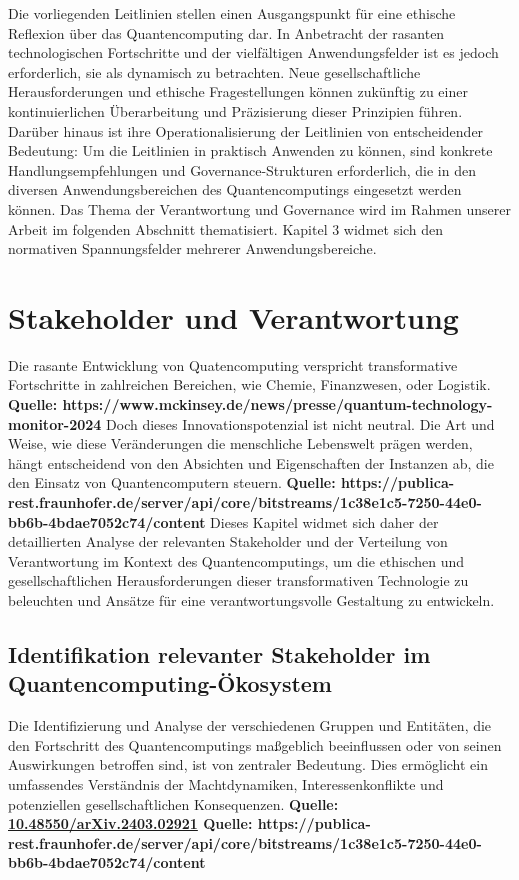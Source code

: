 Die vorliegenden Leitlinien stellen einen Ausgangspunkt für eine ethische Reflexion über das Quantencomputing dar. In Anbetracht der rasanten technologischen Fortschritte und der vielfältigen Anwendungsfelder ist es jedoch erforderlich, sie als dynamisch zu betrachten. Neue gesellschaftliche Herausforderungen und ethische Fragestellungen können zukünftig zu einer kontinuierlichen Überarbeitung und Präzisierung dieser Prinzipien führen. Darüber hinaus ist ihre Operationalisierung der Leitlinien von entscheidender Bedeutung: Um die Leitlinien in praktisch Anwenden zu können, sind konkrete Handlungsempfehlungen und Governance-Strukturen erforderlich, die in den diversen  Anwendungsbereichen des Quantencomputings eingesetzt werden können. Das Thema der Verantwortung und Governance wird im Rahmen unserer Arbeit im folgenden Abschnitt thematisiert. Kapitel 3 widmet sich den normativen Spannungsfelder mehrerer Anwendungsbereiche.


\section{Stakeholder und Verantwortung}
Die rasante Entwicklung von Quatencomputing verspricht transformative Fortschritte in zahlreichen Bereichen, wie Chemie, Finanzwesen, oder Logistik.\textbf{ Quelle: https://www.mckinsey.de/news/presse/quantum-technology-monitor-2024}
Doch dieses Innovationspotenzial ist nicht neutral. Die Art und Weise, wie diese Veränderungen die menschliche Lebenswelt prägen werden, hängt entscheidend von den Absichten und Eigenschaften der Instanzen ab, die den Einsatz von Quantencomputern steuern. 
\textbf{Quelle: https://publica-rest.fraunhofer.de/server/api/core/bitstreams/1c38e1c5-7250-44e0-bb6b-4bdae7052c74/content} 
Dieses Kapitel widmet sich daher der detaillierten Analyse der relevanten Stakeholder und der Verteilung von Verantwortung im Kontext des Quantencomputings, um die ethischen und gesellschaftlichen Herausforderungen dieser transformativen Technologie zu beleuchten und Ansätze für eine verantwortungsvolle Gestaltung zu entwickeln.


\subsection{Identifikation relevanter Stakeholder im Quantencomputing-Ökosystem}
Die Identifizierung und Analyse der verschiedenen Gruppen und Entitäten, die den Fortschritt des Quantencomputings maßgeblich beeinflussen oder von seinen Auswirkungen betroffen sind, ist von zentraler Bedeutung. Dies ermöglicht ein umfassendes Verständnis der Machtdynamiken, Interessenkonflikte und potenziellen gesellschaftlichen Konsequenzen.
\textbf{Quelle: \href{https://doi.org/10.48550/arXiv.2403.02921}{10.48550/arXiv.2403.02921}
Quelle: https://publica-rest.fraunhofer.de/server/api/core/bitstreams/1c38e1c5-7250-44e0-bb6b-4bdae7052c74/content }

